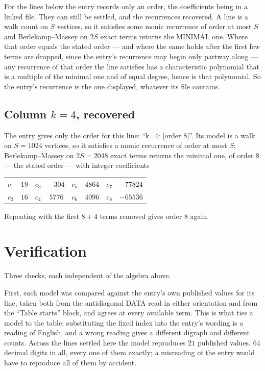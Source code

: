 \documentclass[11pt,a4paper]{article}
\theoremstyle{plain}
\theoremstyle{definition}
\begin{document}
For the lines below the entry records only an order, the coefficients being in a linked file.
They can still be settled, and the recurrences recovered. A line is a walk count on $S$
vertices, so it satisfies some monic recurrence of order at most $S$ and Berlekamp--Massey on
$2S$ exact terms returns the MINIMAL one. Where that order equals the stated order --- and
where the same holds after the first few terms are dropped, since the entry's recurrence may
begin only partway along --- any recurrence of that order the line satisfies has a
characteristic polynomial that is a multiple of the minimal one and of equal degree, hence is
that polynomial. So the entry's recurrence is the one displayed, whatever its file contains.

\subsection*{Column $k=4$, recovered}
The entry gives only the order for this line: ``k=4: [order 8]''. Its model is a walk on
$S=1024$ vertices, so it satisfies a monic recurrence of order at most $S$;
Berlekamp--Massey on $2S=2048$ exact terms returns the minimal one, of order
$8$ --- the stated order --- with integer coefficients
\begin{center}\small\begin{tabular}{cccccccc}
$c_{1}$ & $19$ & $c_{3}$ & $-304$ & $c_{5}$ & $4864$ & $c_{7}$ & $-77824$ \\
$c_{2}$ & $16$ & $c_{4}$ & $5776$ & $c_{6}$ & $4096$ & $c_{8}$ & $-65536$ \\
\end{tabular}\end{center}
Repeating with the first $8+4$ terms removed gives order $8$ again.

\section{Verification}

Three checks, each independent of the algebra above.

First, each model was compared against the entry's own published values for its line, taken
both from the antidiagonal DATA read in either orientation and from the ``Table starts''
block, and agrees at every available term. This is what ties a model to the table:
substituting the fixed index into the entry's wording is a reading of English, and a wrong
reading gives a different digraph and different counts. Across the lines settled here the
model reproduces $21$ published values, $64$ decimal digits in all, every one of
them exactly; a misreading of the entry would have to reproduce all of them by accident.
\end{document}
